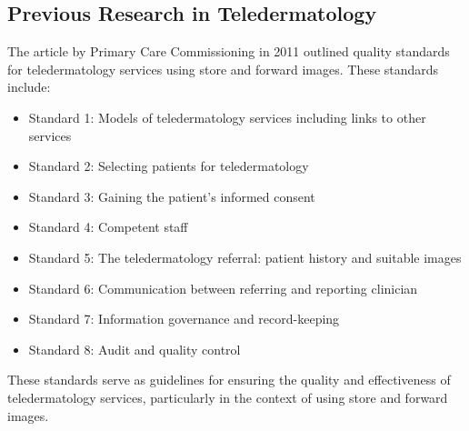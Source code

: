 \subsection{Previous Research in Teledermatology}
\label{sub:PreviousResearchTeledermatology}
The article by Primary Care Commissioning in 2011 outlined quality standards for teledermatology services using store and forward images. These standards include: \par
\noindent
\begin{itemize}
    \item Standard 1: Models of teledermatology services including links to other services
    \item Standard 2: Selecting patients for teledermatology
    \item Standard 3: Gaining the patient's informed consent
    \item Standard 4: Competent staff
    \item Standard 5: The teledermatology referral: patient history and suitable images
    \item Standard 6: Communication between referring and reporting clinician
    \item Standard 7: Information governance and record-keeping
    \item Standard 8: Audit and quality control
\end{itemize}
\par
\noindent
These standards serve as guidelines for ensuring the quality and effectiveness of teledermatology services, particularly in the context of using store and forward images.